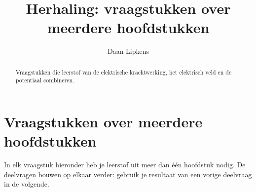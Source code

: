 \documentclass{ximera}
\title{Herhaling: vraagstukken over meerdere hoofdstukken}
\author{Daan Lipkens}
\begin{document}
\begin{abstract}
    Vraagstukken die leerstof van de elektrische krachtwerking, het elektrisch veld en de potentiaal combineren.
\end{abstract}
\maketitle

\section{Vraagstukken over meerdere hoofdstukken}

In elk vraagstuk hieronder heb je leerstof uit meer dan één hoofdstuk nodig. De deelvragen bouwen op elkaar verder: gebruik je resultaat van een vorige deelvraag in de volgende.
\end{document}
